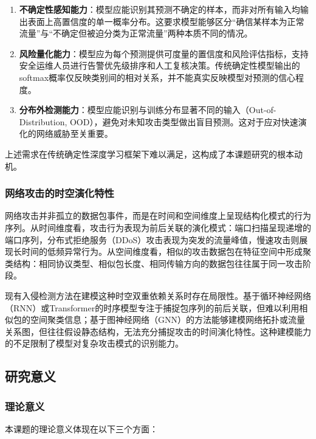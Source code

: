 \begin{enumerate}
  \item \textbf{不确定性感知能力}：模型应能识别其预测不确定的样本，而非对所有输入均输出表面上高置信度的单一概率分布。这要求模型能够区分``确信某样本为正常流量''与``不确定但被迫分类为正常流量''两种本质不同的情况。

  \item \textbf{风险量化能力}：模型应为每个预测提供可度量的置信度和风险评估指标，支持安全运维人员进行告警优先级排序和人工复核决策。传统确定性模型输出的softmax概率仅反映类别间的相对关系，并不能真实反映模型对预测的信心程度。

  \item \textbf{分布外检测能力}：模型应能识别与训练分布显著不同的输入（Out-of-Distribution, OOD），避免对未知攻击类型做出盲目预测。这对于应对快速演化的网络威胁至关重要。
\end{enumerate}

上述需求在传统确定性深度学习框架下难以满足，这构成了本课题研究的根本动机。

\subsubsection{网络攻击的时空演化特性}

网络攻击并非孤立的数据包事件，而是在时间和空间维度上呈现结构化模式的行为序列。从时间维度看，攻击行为表现为前后关联的演化模式：端口扫描呈现递增的端口序列，分布式拒绝服务（DDoS）攻击表现为突发的流量峰值，慢速攻击则展现长时间的低频异常行为。从空间维度看，相似的攻击数据包在特征空间中形成聚类结构：相同协议类型、相似包长度、相同传输方向的数据包往往属于同一攻击阶段。

现有入侵检测方法在建模这种时空双重依赖关系时存在局限性。基于循环神经网络（RNN）或Transformer的时序模型专注于捕捉包序列的前后关联，但难以利用相似包的空间聚类信息；基于图神经网络（GNN）的方法能够建模网络拓扑或流量关系图，但往往假设静态结构，无法充分捕捉攻击的时间演化特性。这种建模能力的不足限制了模型对复杂攻击模式的识别能力。

\subsection{研究意义}

\subsubsection{理论意义}

本课题的理论意义体现在以下三个方面：

